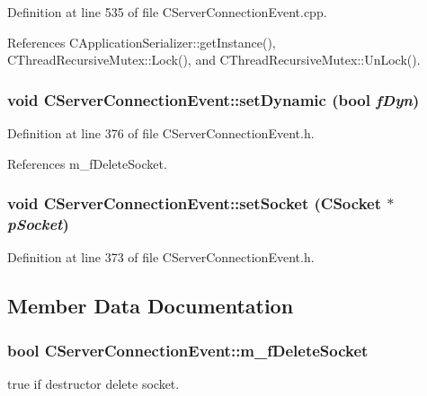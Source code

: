 Definition at line 535 of file CServer\-Connection\-Event.cpp.

References CApplication\-Serializer::get\-Instance(), CThread\-Recursive\-Mutex::Lock(), and CThread\-Recursive\-Mutex::Un\-Lock().
\subsubsection{\setlength{\rightskip}{0pt plus 5cm}void CServer\-Connection\-Event::set\-Dynamic (bool {\em f\-Dyn})\hspace{0.3cm}{\tt  [inline, protected]}}\label{classCServerConnectionEvent_b1}




Definition at line 376 of file CServer\-Connection\-Event.h.

References m\_\-f\-Delete\-Socket.
\subsubsection{\setlength{\rightskip}{0pt plus 5cm}void CServer\-Connection\-Event::set\-Socket ({\bf CSocket} $\ast$ {\em p\-Socket})\hspace{0.3cm}{\tt  [inline, protected]}}\label{classCServerConnectionEvent_b0}




Definition at line 373 of file CServer\-Connection\-Event.h.

\subsection{Member Data Documentation}
\subsubsection{\setlength{\rightskip}{0pt plus 5cm}bool CServer\-Connection\-Event::m\_\-f\-Delete\-Socket\hspace{0.3cm}{\tt  [private]}}\label{classCServerConnectionEvent_o1}


true if destructor delete socket.



